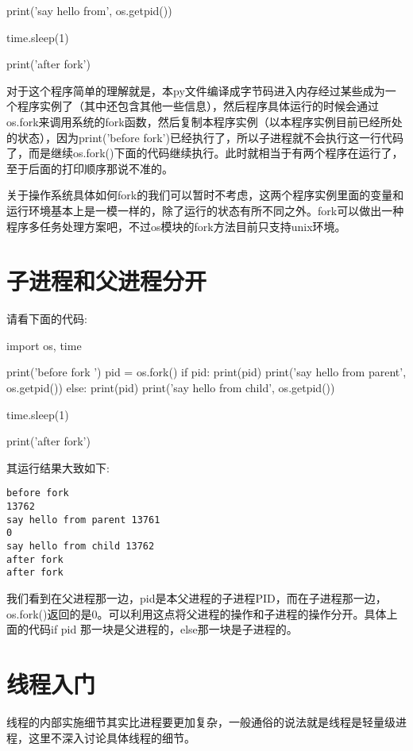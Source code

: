 \documentclass[12pt,oneside]{book}
\begin{document}
\begin{common-format}
\begin{tcbpython}[]
print('say hello from', os.getpid())

time.sleep(1)

print('after fork')
\end{tcbpython}

对于这个程序简单的理解就是，本py文件编译成字节码进入内存经过某些成为一个程序实例了（其中还包含其他一些信息），然后程序具体运行的时候会通过os.fork来调用系统的fork函数，然后复制本程序实例（以本程序实例目前已经所处的状态），因为print('before fork')已经执行了，所以子进程就不会执行这一行代码了，而是继续os.fork()下面的代码继续执行。此时就相当于有两个程序在运行了，至于后面的打印顺序那说不准的。

关于操作系统具体如何fork的我们可以暂时不考虑，这两个程序实例里面的变量和运行环境基本上是一模一样的，除了运行的状态有所不同之外。fork可以做出一种程序多任务处理方案吧，不过os模块的fork方法目前只支持unix环境。

\section{子进程和父进程分开}
请看下面的代码: 

\begin{tcbpython}[]
import os, time

print('before fork ')
pid = os.fork()
if pid:
    print(pid)
    print('say hello from parent', os.getpid())
else:
    print(pid)
    print('say hello from child', os.getpid())

time.sleep(1)

print('after fork')
\end{tcbpython}

其运行结果大致如下:

\begin{Verbatim}
before fork 
13762
say hello from parent 13761
0
say hello from child 13762
after fork
after fork
\end{Verbatim}

我们看到在父进程那一边，pid是本父进程的子进程PID，而在子进程那一边，os.fork()返回的是0。可以利用这点将父进程的操作和子进程的操作分开。具体上面的代码if pid 那一块是父进程的，else那一块是子进程的。







\section{线程入门}
线程的内部实施细节其实比进程要更加复杂，一般通俗的说法就是线程是轻量级进程，这里不深入讨论具体线程的细节。


\end{common-format}
\end{document}
